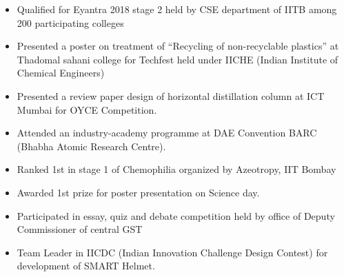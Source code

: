 \documentclass[10pt,a4paper,ragged2e]{altacv}
\begin{document}
\begin{itemize}
 
\item Qualified for Eyantra 2018 stage 2 held by CSE department of IITB among 200 participating colleges

 
\item Presented a poster on treatment of “Recycling of non-recyclable plastics” at Thadomal sahani college for Techfest held under IICHE (Indian Institute of Chemical Engineers)

 
\item Presented a review paper design of  horizontal distillation column at ICT Mumbai for OYCE Competition. 

 
\item Attended an industry-academy programme at DAE Convention BARC (Bhabha Atomic Research Centre).

 
\item Ranked 1st in stage 1 of Chemophilia organized by Azeotropy, IIT Bombay

 
\item Awarded 1st prize for poster presentation on Science day.

 
\item Participated in essay, quiz and debate competition held by office of Deputy Commissioner of central GST

 
\item Team Leader in IICDC (Indian Innovation Challenge Design Contest) for development of SMART Helmet.

\end{itemize}



\end{document}
